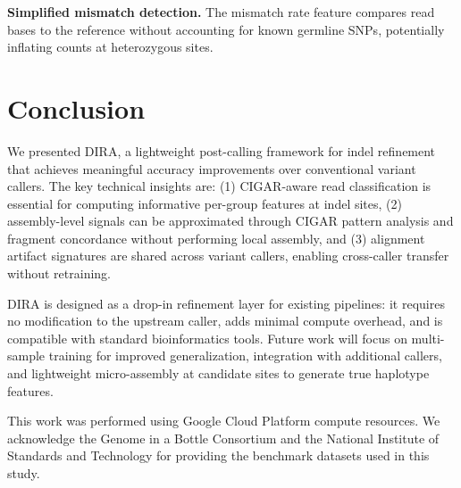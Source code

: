 \documentclass[sigconf]{acmart}
\begin{document}
\textbf{Simplified mismatch detection.} The mismatch rate feature compares read bases to the reference without accounting for known germline SNPs, potentially inflating counts at heterozygous sites.

\section{Conclusion}

We presented DIRA, a lightweight post-calling framework for indel refinement that achieves meaningful accuracy improvements over conventional variant callers. The key technical insights are: (1) CIGAR-aware read classification is essential for computing informative per-group features at indel sites, (2) assembly-level signals can be approximated through CIGAR pattern analysis and fragment concordance without performing local assembly, and (3) alignment artifact signatures are shared across variant callers, enabling cross-caller transfer without retraining.

DIRA is designed as a drop-in refinement layer for existing pipelines: it requires no modification to the upstream caller, adds minimal compute overhead, and is compatible with standard bioinformatics tools. Future work will focus on multi-sample training for improved generalization, integration with additional callers, and lightweight micro-assembly at candidate sites to generate true haplotype features.

\begin{acks}
This work was performed using Google Cloud Platform compute resources. We acknowledge the Genome in a Bottle Consortium and the National Institute of Standards and Technology for providing the benchmark datasets used in this study.
\end{acks}
\end{document}
